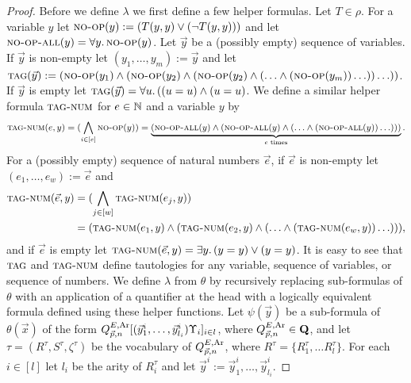 \documentclass[../main/thesis.tex]{subfiles}
\begin{document}
\begin{proof}
  Before we define $\lambda$ we first define a few helper formulas. Let $T \in
  \rho$. For a variable $y$ let ${\normalfont\textsc{no-op}}(y) := (T(y, y) \lor (\neg T(y, y)))$
  and let ${\normalfont\textsc{no-op-all}}(y) = \forall y .\, {\normalfont\textsc{no-op}}(y)$. Let $\vec{y}$ be a
  (possibly empty) sequence of variables. If $\vec{y}$ is non-empty let $(y_1,
  \ldots, y_m) := \vec{y}$ and let ${\normalfont\textsc{tag}} (\vec{y}) := ({\normalfont\textsc{no-op}}(y_1) \land
  ({\normalfont\textsc{no-op}}(y_2) \land ( {\normalfont\textsc{no-op}}(y_2) \land ( \ldots \land
  ({\normalfont\textsc{no-op}}(y_m)) \ldots))\ldots ))$. If $\vec{y}$ is empty let ${\normalfont\textsc{tag}}
  (\vec{y}) = \forall u .\, ((u = u) \land (u = u)$. We define a similar helper
  formula ${\normalfont\textsc{tag-num}}$ for $e \in \mathbb{N}$ and a variable $y$ by
  \begin{align*}
    {\normalfont\textsc{tag-num}}(e, y) = (\bigwedge_{i \in [e]}{\normalfont\textsc{no-op}}(y)) = \underbrace{({\normalfont\textsc{no-op-all}}(y) \land ({\normalfont\textsc{no-op-all}}(y) \land (\ldots \land ({\normalfont\textsc{no-op-all}}(y)) \ldots )))}_{e \text{ times}}.
  \end{align*}
  For a (possibly empty) sequence of natural numbers $\vec{e}$, if $\vec{e}$ is
  non-empty let $ (e_1, \ldots, e_w) := \vec{e}$ and
  \begin{align*}
    {\normalfont\textsc{tag-num}}(\vec{e}, y) &= (\bigwedge_{j \in [w]}{\normalfont\textsc{tag-num}}(e_j, y)) \\&= ({\normalfont\textsc{tag-num}}(e_1 , y) \land ({\normalfont\textsc{tag-num}}(e_2, y) \land ( \ldots  \land ({\normalfont\textsc{tag-num}}(e_w, y)) \ldots ))), 
  \end{align*}
  and if $\vec{e}$ is empty let ${\normalfont\textsc{tag-num}}(\vec{e}, y) = \exists y. \, (y =
  y) \lor (y = y)$. It is easy to see that ${\normalfont\textsc{tag}}$ and ${\normalfont\textsc{tag-num}}$ define
  tautologies for any variable, sequence of variables, or sequence of numbers.
  We define $\lambda$ from $\theta$ by recursively replacing sub-formulas of
  $\theta$ with an application of a quantifier at the head with a logically
  equivalent formula defined using these helper functions. Let $\psi (\vec{y})$
  be a sub-formula of $\theta (\vec{x})$ of the form $Q^{E, \text{\upshape Ar}}_{\vec{p}, n}
  [(\vec{y}^i_1, \ldots, \vec{y}^i_{l_i}) \Upsilon_i]_{i \in l}$, where $Q^{E,
    \text{\upshape Ar}}_{\vec{p}, n} \in \mathbf{Q}$, and let $\tau = (R^{\tau}, S^{\tau},
  \zeta^{\tau})$ be the vocabulary of $Q^{E, \text{\upshape Ar}}_{\vec{p}, n}$, where $R^{\tau}
  = \{R^{\tau}_1, \ldots R^{\tau}_l\}$. For each $i \in [l]$ let $l_i$ be the
  arity of $R^{\tau}_i$ and let $\vec{y}^i := \vec{y}^i_1, \ldots,
  \vec{y}^i_{l_i}$.


\end{proof}
\end{document}
